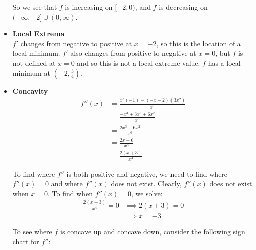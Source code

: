 \documentclass[handout,nooutcomes]{ximera}
\renewenvironment{freeResponse}{
\ifhandout\setbox0\vbox\bgroup\else
\begin{trivlist}\item[\hskip \labelsep\bfseries Solution:\hspace{2ex}]
\fi}
{\ifhandout\egroup\else
\end{trivlist}
\fi}
\newcommand{\dfn}{\textbf}
\begin{document}
\begin{problem}
\begin{freeResponse}
\begin{itemize}
       So we see that $f$ is increasing on $[-2,0)$, and $f$ is decreasing on $(-\infty, -2] \cup (0,\infty)$.
       
     \item
       \dfn{Local Extrema}  \\
       $f'$ changes from negative to positive at $x=-2$, so this is the location of a local minimum.
       $f'$ also changes from positive to negative at $x=0$, but $f$ is not defined at $x=0$ and so this is not a local extreme value.
       $f$ has a local minimum at $\left( -2,\frac{3}{4} \right)$.
			
			
			
     \item
       \dfn{Concavity}
       \begin{align*}
         f''(x) &= \frac{x^3(-1) - (-x-2)(3x^2)}{x^6} \\
                &= \frac{-x^3 + 3x^3 + 6x^2}{x^6} \\
		&= \frac{2x^3 + 6x^2}{x^6} \\
		&= \frac{2x+6}{x^4} \\
		&= \frac{2(x+3)}{x^4}
       \end{align*}
			
       To find where $f''$ is both positive and negative, we need to find where $f''(x) = 0$ and where $f''(x)$ does not exist.
       Clearly, $f''(x)$ does not exist when $x=0$.
       To find when $f''(x) = 0$, we solve:
       \begin{align*}
         \frac{2(x+3)}{x^4} = 0 &\implies 2(x+3) = 0\\
         &\implies x=-3
       \end{align*}
			
       To see where $f$ is concave up and concave down, consider the following sign chart for $f''$:
       \begin{center}
         \begin{image}
         \end{image}
       \end{center}


\end{itemize}
\end{freeResponse}
\end{problem}
\end{document}
